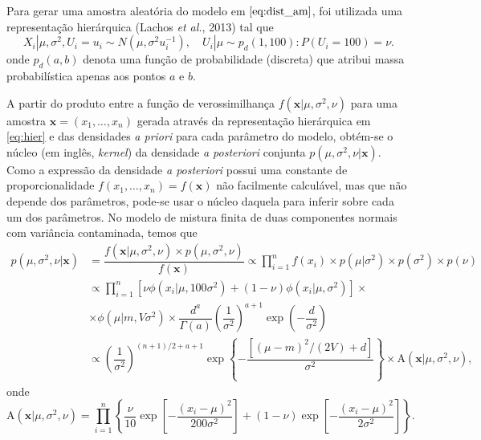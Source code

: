 Para gerar uma amostra aleatória do modelo em $\eqref{eq:dist_am}$, foi utilizada uma representação hierárquica (Lachos \textit{et al.}, 2013)\cite{Lachos2013} tal que
\begin{equation}
X_i | \mu, \sigma^2, U_{i} = u_i \sim{N}(\mu, \sigma^2 u_i^{-1}), \quad U_i | \mu \sim{p_d}(1,100) : P(U_i = 100) = \nu. \label{eq:hier}
\end{equation}
\noindent onde $p_d(a,b)$ denota uma função de probabilidade (discreta) que atribui massa probabilística apenas aos pontos $a$ e $b$.

A partir do produto entre a função de verossimilhança $f(\bm{x} | \mu, \sigma^2, \nu)$ para uma amostra $\bm{x} = (x_1, \ldots, x_n)$ gerada através da representação hierárquica em \eqref{eq:hier} e das densidades \textit{a priori} para cada parâmetro do modelo, obtém-se o núcleo (em inglês, \textit{kernel}) da densidade \textit{a posteriori} conjunta $p(\mu, \sigma^2, \nu | \bm{x})$. Como a expressão da densidade \textit{a posteriori} possui uma constante de proporcionalidade $f(x_1, \ldots, x_n) = f(\bm{x})$ não facilmente calculável, mas que não depende dos parâmetros, pode-se usar o núcleo daquela para inferir sobre cada um dos parâmetros. No modelo de mistura finita de duas componentes normais com variância contaminada, temos que
\begin{align}
p(\mu, \sigma^2, \nu | \bm{x})
&= \dfrac{f(\bm{x} | \mu, \sigma^2, \nu) \times p(\mu, \sigma^2, \nu)}{f(\bm{x})} \propto \prod_{i=1}^{n} f(x_i) \times p(\mu | \sigma^2) \times p(\sigma^2) \times p(\nu) \nonumber\\
&\propto \prod_{i=1}^{n} \left[ \nu \phi(x_i | \mu, 100 \sigma^2) + (1 - \nu) \phi(x_i | \mu, \sigma^2) \right] \times \nonumber \\
&\times \phi(\mu | m, V \sigma^2) \times \dfrac{d^a}{\Gamma(a)} \left(\dfrac{1}{\sigma^2}\right)^{a + 1} \exp\left(-\dfrac{d}{\sigma^2}\right) \nonumber \\
&\propto \left(\dfrac{1}{\sigma^2}\right)^{(n + 1)/2 + a + 1} \exp\left\{-\dfrac{\left[(\mu - m)^2 / (2V) + d\right]}{\sigma^2}\right\} \times \textrm{A}(\bm{x} | \mu, \sigma^2, \nu), \label{eq:dist_post}
\end{align}
onde
\begin{equation*}
\textrm{A}(\bm{x} | \mu, \sigma^2, \nu) = \prod_{i=1}^{n} \left\{  \dfrac{\nu}{10} \exp\left[-\dfrac{(x_i - \mu)^2}{200\sigma^2}\right] + (1 - \nu) \exp\left[-\dfrac{(x_i - \mu)^2}{2\sigma^2}\right] \right\}.
\end{equation*}

